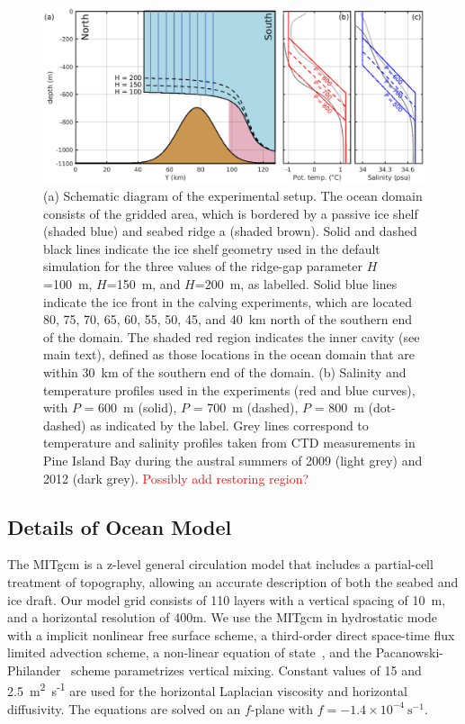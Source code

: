 \documentclass[draft]{agujournal2019}
\newcommand{\red}[1]{\textcolor{red}{#1}}
\begin{document}
\begin{figure}
    \centering
    \includegraphics[width = \textwidth]{../make_figures/plots/figure2.eps}
    \caption{(a) Schematic diagram of the experimental setup. The ocean domain consists of the gridded area, which is bordered by a passive ice shelf (shaded blue) and seabed ridge a (shaded brown). Solid and dashed black lines indicate the ice shelf geometry used in the default simulation for the three values of the ridge-gap parameter $H$=100~m, $H$=150~m, and $H$=200~m, as labelled. Solid blue lines indicate the ice front in the calving experiments, which are located 80, 75, 70, 65, 60, 55, 50, 45, and 40~km north of the southern end of the domain. The shaded red region indicates the inner cavity (see main text), defined as those locations in the ocean domain that are within 30~km of the southern end of the domain. (b) Salinity and temperature profiles used in the experiments (red and blue curves), with $P$ = 600~m (solid), $P$ = 700~m (dashed), $P$ = 800~m (dot-dashed) as indicated by the label. Grey lines correspond to temperature and salinity profiles taken from CTD measurements in Pine Island Bay during the austral summers of 2009 (light grey) and 2012 (dark grey).  \red{Possibly add restoring region?}}
    \label{fig:figure2}
\end{figure}

\subsection{Details of Ocean Model}
The MITgcm is a z-level general circulation model that includes a partial-cell treatment of topography, allowing an accurate description of both the seabed and ice draft. Our model grid consists of 110 layers with a vertical spacing of 10~m, and a horizontal resolution of 400m. We use the MITgcm in hydrostatic mode with a implicit nonlinear free surface scheme, a third-order direct space-time flux limited advection scheme, a non-linear equation of state~, and the Pacanowski-Philander~\cite{Pacanowski1981JPhysOcean} scheme parametrizes vertical mixing. Constant values of 15 and 2.5~m\textsuperscript{2}~s\textsuperscript{-1} are used for the horizontal Laplacian viscosity and horizontal diffusivity. The equations are solved on an $f$-plane with $f = -1.4\times10^{-4}~\text{s}^{-1}$.
\end{document}
